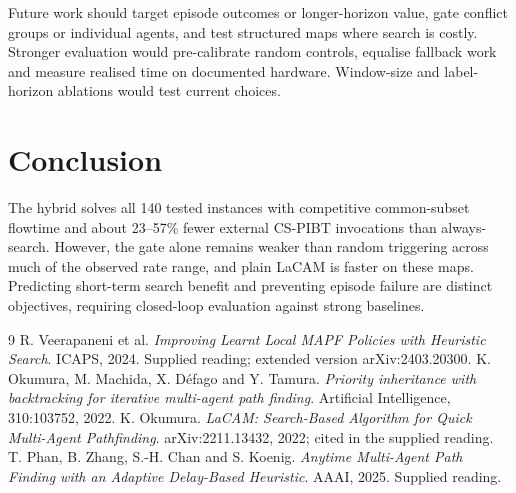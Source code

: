 \documentclass[10pt,a4paper]{article}
\begin{document}
Future work should target episode outcomes or longer-horizon value, gate conflict groups or individual agents, and test structured maps where search is costly. Stronger evaluation would pre-calibrate random controls, equalise fallback work and measure realised time on documented hardware. Window-size and label-horizon ablations would test current choices.

\section{Conclusion}
The hybrid solves all 140 tested instances with competitive common-subset flowtime and about 23--57\% fewer external CS-PIBT invocations than always-search. However, the gate alone remains weaker than random triggering across much of the observed rate range, and plain LaCAM is faster on these maps. Predicting short-term search benefit and preventing episode failure are distinct objectives, requiring closed-loop evaluation against strong baselines.
\begingroup\small
\begin{thebibliography}{9}\setlength{\itemsep}{0pt}
 R. Veerapaneni et al. \emph{Improving Learnt Local MAPF Policies with Heuristic Search}. ICAPS, 2024. Supplied reading; extended version arXiv:2403.20300.
 K. Okumura, M. Machida, X. D\'efago and Y. Tamura. \emph{Priority inheritance with backtracking for iterative multi-agent path finding}. Artificial Intelligence, 310:103752, 2022.
 K. Okumura. \emph{LaCAM: Search-Based Algorithm for Quick Multi-Agent Pathfinding}. arXiv:2211.13432, 2022; cited in the supplied reading.
 T. Phan, B. Zhang, S.-H. Chan and S. Koenig. \emph{Anytime Multi-Agent Path Finding with an Adaptive Delay-Based Heuristic}. AAAI, 2025. Supplied reading.
\end{thebibliography}\endgroup
\end{document}
